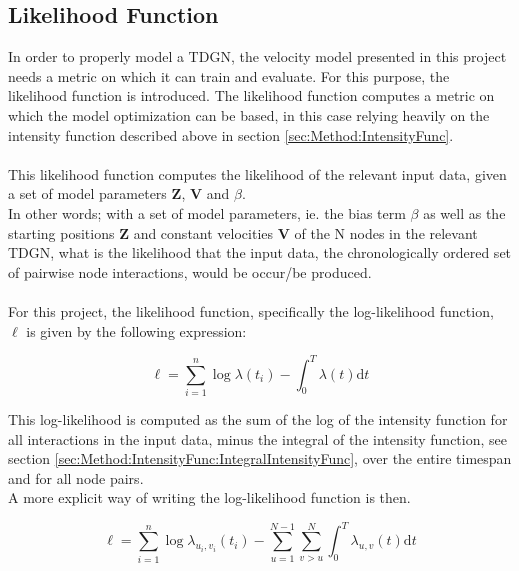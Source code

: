 
\subsection{Likelihood Function}
\label{sec:Method:LikelihoodFunc}

In order to properly model a TDGN, the velocity model presented in this project needs a metric on which it can train and evaluate.
For this purpose, the likelihood function is introduced.
The likelihood function computes a metric on which the model optimization can be based, in this case relying heavily on the intensity function described above in section \ref{sec:Method:IntensityFunc}.
\\\\
This likelihood function computes the likelihood of the relevant input data, given a set of model parameters $\textbf{Z}$, $\textbf{V}$ and $\beta$.
\\
In other words; with a set of model parameters, ie. the bias term $\beta$ as well as the starting positions $\textbf{Z}$ and constant velocities $\textbf{V}$ of the N nodes in the relevant TDGN, what is the likelihood that the input data, the chronologically ordered set of pairwise node interactions, would be occur/be produced.
\\\\
For this project, the likelihood function, specifically the log-likelihood function, $\ell$ is given by the following expression:

\begin{equation}
    \ell = \sum_{i=1}^n \log \lambda (t_i) - \int_{0}^T \lambda(t) \mathrm{d} t
    \label{eq:LogLikelihoodFunc}
\end{equation}

This log-likelihood is computed as the sum of the log of the intensity function for all interactions in the input data, minus the integral of the intensity function, see section \ref{sec:Method:IntensityFunc:IntegralIntensityFunc}, over the entire timespan and for all node pairs.
\\
A more explicit way of writing the log-likelihood function is then.

\begin{equation}
    \ell = \sum_{i=1}^n \log \lambda_{u_i,v_i} (t_i) - \sum_{u=1}^{N-1} \sum_{v > u}^{N} \int_{0}^T \lambda_{u,v}(t) \mathrm{d} t
    \label{eq:LogLikelihoodFuncExplicit}
\end{equation}














